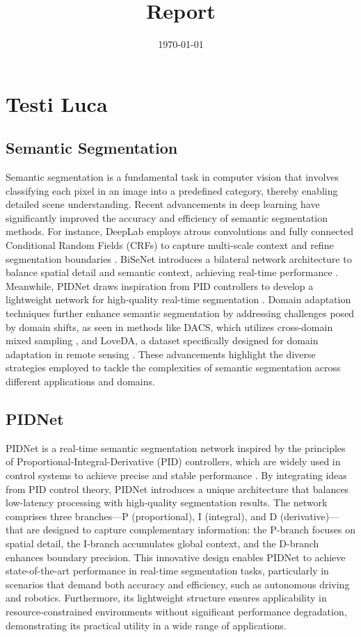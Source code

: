 \documentclass[a4paper,12pt]{article}
\title{Report}
\date{\today}
\begin{document}
\maketitle

\section{Testi Luca}

\subsection{Semantic Segmentation}
Semantic segmentation is a fundamental task in computer vision that involves classifying each pixel in an image into a predefined category, thereby enabling detailed scene understanding. Recent advancements in deep learning have significantly improved the accuracy and efficiency of semantic segmentation methods. For instance, DeepLab employs atrous convolutions and fully connected Conditional Random Fields (CRFs) to capture multi-scale context and refine segmentation boundaries \cite{chen2017deeplab}. BiSeNet introduces a bilateral network architecture to balance spatial detail and semantic context, achieving real-time performance \cite{yu2018bisenet}. Meanwhile, PIDNet draws inspiration from PID controllers to develop a lightweight network for high-quality real-time segmentation \cite{feng2021pidnet}. Domain adaptation techniques further enhance semantic segmentation by addressing challenges posed by domain shifts, as seen in methods like DACS, which utilizes cross-domain mixed sampling \cite{tranheden2021dacs}, and LoveDA, a dataset specifically designed for domain adaptation in remote sensing \cite{wang2021loveda}. These advancements highlight the diverse strategies employed to tackle the complexities of semantic segmentation across different applications and domains.

\subsection{PIDNet}

PIDNet is a real-time semantic segmentation network inspired by the principles of Proportional-Integral-Derivative (PID) controllers, which are widely used in control systems to achieve precise and stable performance \cite{feng2021pidnet}. By integrating ideas from PID control theory, PIDNet introduces a unique architecture that balances low-latency processing with high-quality segmentation results. The network comprises three branches—P (proportional), I (integral), and D (derivative)—that are designed to capture complementary information: the P-branch focuses on spatial detail, the I-branch accumulates global context, and the D-branch enhances boundary precision. This innovative design enables PIDNet to achieve state-of-the-art performance in real-time segmentation tasks, particularly in scenarios that demand both accuracy and efficiency, such as autonomous driving and robotics. Furthermore, its lightweight structure ensures applicability in resource-constrained environments without significant performance degradation, demonstrating its practical utility in a wide range of applications.
\end{document}
